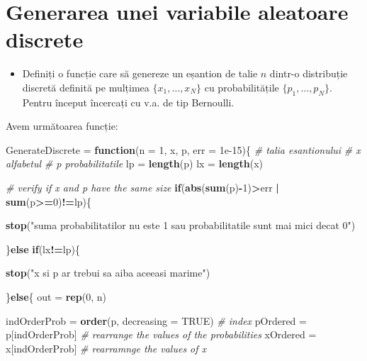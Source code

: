 \documentclass[]{article}
\newenvironment{Shaded}{\begin{snugshade}}{\end{snugshade}}
\newcommand{\CommentTok}[1]{\textcolor[rgb]{0.56,0.35,0.01}{\textit{#1}}}
\newcommand{\ControlFlowTok}[1]{\textcolor[rgb]{0.13,0.29,0.53}{\textbf{#1}}}
\newcommand{\DataTypeTok}[1]{\textcolor[rgb]{0.13,0.29,0.53}{#1}}
\newcommand{\DecValTok}[1]{\textcolor[rgb]{0.00,0.00,0.81}{#1}}
\newcommand{\FloatTok}[1]{\textcolor[rgb]{0.00,0.00,0.81}{#1}}
\newcommand{\KeywordTok}[1]{\textcolor[rgb]{0.13,0.29,0.53}{\textbf{#1}}}
\newcommand{\NormalTok}[1]{#1}
\newcommand{\OperatorTok}[1]{\textcolor[rgb]{0.81,0.36,0.00}{\textbf{#1}}}
\newcommand{\OtherTok}[1]{\textcolor[rgb]{0.56,0.35,0.01}{#1}}
\newcommand{\StringTok}[1]{\textcolor[rgb]{0.31,0.60,0.02}{#1}}
\newenvironment{frshaded*}{%
  \def\FrameCommand{\fboxrule=\FrameRule\fboxsep=\FrameSep \fcolorbox{framecolor}{shadecolor1}}%
  \MakeFramed {\advance\hsize-\width \FrameRestore}}%
{\endMakeFramed}
\newenvironment{rmdblock}[1]
  {\begin{frshaded*}
  \begin{itemize}
  \renewcommand{\labelitemi}{
    \raisebox{-.7\height}[0pt][0pt]{
      {\setkeys{Gin}{width=2em,keepaspectratio}\texttt{[image: images/icons/\#1]}}
    }
  }
  \item
  }
  {
  \end{itemize}
  \end{frshaded*}
  }
\newenvironment{rmdexercise}
  {\begin{rmdblock}{exercise}}
  {\end{rmdblock}}
\begin{document}
\hypertarget{generarea-unei-variabile-aleatoare-discrete}{%
\section{Generarea unei variabile aleatoare
discrete}\label{generarea-unei-variabile-aleatoare-discrete}}

\begin{rmdexercise}
Definiți o funcție care să genereze un eșantion de talie \(n\) dintr-o
distribuție discretă definită pe mulțimea \(\{x_1,\dots,x_N\}\) cu
probabilitățile \(\{p_1,\dots,p_N\}\). Pentru început încercați cu v.a.
de tip Bernoulli.
\end{rmdexercise}

Avem următoarea funcție:

\begin{Shaded}
\begin{Highlighting}[]
\NormalTok{GenerateDiscrete =}\StringTok{ }\ControlFlowTok{function}\NormalTok{(}\DataTypeTok{n =} \DecValTok{1}\NormalTok{, x, p, }\DataTypeTok{err =} \FloatTok{1e-15}\NormalTok{)\{}
  \CommentTok{# talia esantionului}
  \CommentTok{# x alfabetul }
  \CommentTok{# p probabilitatile}
\NormalTok{  lp =}\StringTok{ }\KeywordTok{length}\NormalTok{(p)}
\NormalTok{  lx =}\StringTok{ }\KeywordTok{length}\NormalTok{(x)}
  
  \CommentTok{# verify if x and p have the same size }
  \ControlFlowTok{if}\NormalTok{(}\KeywordTok{abs}\NormalTok{(}\KeywordTok{sum}\NormalTok{(p)}\OperatorTok{-}\DecValTok{1}\NormalTok{)}\OperatorTok{>}\NormalTok{err }\OperatorTok{|}\StringTok{ }\KeywordTok{sum}\NormalTok{(p}\OperatorTok{>=}\DecValTok{0}\NormalTok{)}\OperatorTok{!=}\NormalTok{lp)\{}
    
    \KeywordTok{stop}\NormalTok{(}\StringTok{"suma probabilitatilor nu este 1 sau probabilitatile sunt mai mici decat 0"}\NormalTok{)}
    
\NormalTok{  \}}\ControlFlowTok{else} \ControlFlowTok{if}\NormalTok{(lx}\OperatorTok{!=}\NormalTok{lp)\{}
    
    \KeywordTok{stop}\NormalTok{(}\StringTok{"x si p ar trebui sa aiba aceeasi marime"}\NormalTok{)}
    
\NormalTok{  \}}\ControlFlowTok{else}\NormalTok{\{}
\NormalTok{    out =}\StringTok{ }\KeywordTok{rep}\NormalTok{(}\DecValTok{0}\NormalTok{, n)}
    
\NormalTok{    indOrderProb =}\StringTok{ }\KeywordTok{order}\NormalTok{(p, }\DataTypeTok{decreasing =} \OtherTok{TRUE}\NormalTok{) }\CommentTok{# index}
\NormalTok{    pOrdered =}\StringTok{ }\NormalTok{p[indOrderProb] }\CommentTok{# rearrange the values of the probabilities }
\NormalTok{    xOrdered =}\StringTok{ }\NormalTok{x[indOrderProb] }\CommentTok{# rearramnge the values of x}
    

\end{Highlighting}
\end{Shaded}
\end{document}
